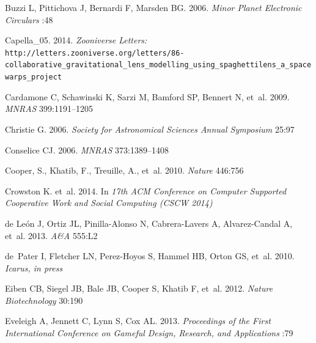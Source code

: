 \documentclass{ar2e}
\def\aap{A{\&}A}
\def\mnras{MNRAS}
\def\url#1{\texttt{#1}}
\begin{document}
\begin{thebibliography}{}
{Buzzi} L, {Pittichova} J, {Bernardi} F, {Marsden} BG. 2006.
\newblock \textit{Minor Planet Electronic Circulars} :48

{Capella\_05}. 2014.
\newblock \textit{Zooniverse Letters:} \url{http://letters.zooniverse.org/letters/86-collaborative\_gravitational\_lens\_modelling\_using\_spaghettilens\_a\_spacewarps\_project}

{Cardamone} C, {Schawinski} K, {Sarzi} M, {Bamford} SP, {Bennert} N, et~al.
  2009.
\newblock \textit{\mnras} 399:1191--1205

{Christie} G. 2006.
\newblock \textit{Society for Astronomical Sciences Annual Symposium} 25:97

{Conselice} CJ. 2006.
\newblock \textit{\mnras} 373:1389--1408

{Cooper}, S., {Khatib}, F., {Treuille}, A., {et~al.} 2010.
\newblock \textit{Nature} 446:756

{Crowston} K. {et~al.} 2014.
\newblock In \textit{17th ACM Conference on Computer Supported Cooperative Work
  and Social Computing (CSCW 2014)}

{de Le{\'o}n} J, {Ortiz} JL, {Pinilla-Alonso} N, {Cabrera-Lavers} A,
  {Alvarez-Candal} A, et~al. 2013.
\newblock \textit{\aap} 555:L2

de~Pater I, Fletcher LN, Perez-Hoyos S, Hammel HB, Orton GS, et~al. 2010.
\newblock \textit{Icarus, in press}

{Eiben} CB, {Siegel} JB, {Bale} JB, {Cooper} S, {Khatib} F, et~al. 2012.
\newblock \textit{{Nature Biotechnology}} 30:190

{Eveleigh} A, {Jennett} C, {Lynn} S, {Cox} AL. 2013.
\newblock \textit{{Proceedings of the First International Conference on Gameful
  Design, Research, and Applications}} :79


\end{thebibliography}
\end{document}
